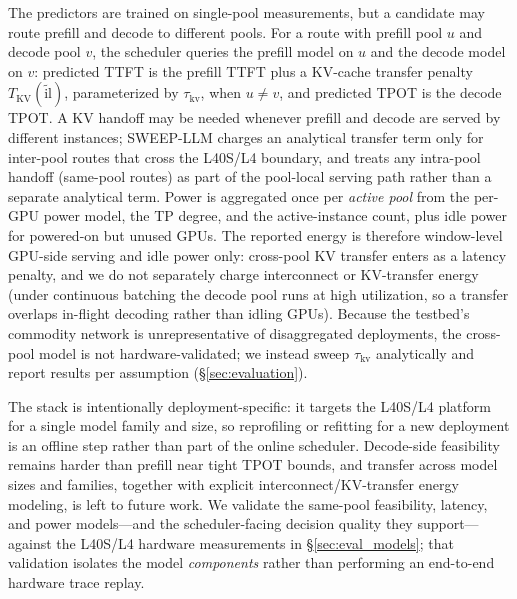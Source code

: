 The predictors are trained on single-pool measurements, but a candidate may route prefill and decode to different pools.
For a route with prefill pool $u$ and decode pool $v$, the scheduler queries the prefill model on $u$ and the decode model on $v$: predicted TTFT is the prefill TTFT plus a KV-cache transfer penalty $T_{\mathrm{KV}}(\tilde{\mathrm{il}})$, parameterized by $\tau_{\mathrm{kv}}$, when $u\neq v$, and predicted TPOT is the decode TPOT.
A KV handoff may be needed whenever prefill and decode are served by different instances; SWEEP-LLM charges an analytical transfer term only for inter-pool routes that cross the L40S/L4 boundary, and treats any intra-pool handoff (same-pool routes) as part of the pool-local serving path rather than a separate analytical term.
Power is aggregated once per \emph{active pool} from the per-GPU power model, the TP degree, and the active-instance count, plus idle power for powered-on but unused GPUs.
The reported energy is therefore window-level GPU-side serving and idle power only: cross-pool KV transfer enters as a latency penalty, and we do not separately charge interconnect or KV-transfer energy (under continuous batching the decode pool runs at high utilization, so a transfer overlaps in-flight decoding rather than idling GPUs).
Because the testbed's commodity network is unrepresentative of disaggregated deployments, the cross-pool model is not hardware-validated; we instead sweep $\tau_{\mathrm{kv}}$ analytically and report results per assumption (\S\ref{sec:evaluation}).

The stack is intentionally deployment-specific: it targets the L40S/L4 platform for a single model family and size, so reprofiling or refitting for a new deployment is an offline step rather than part of the online scheduler.
Decode-side feasibility remains harder than prefill near tight TPOT bounds, and transfer across model sizes and families, together with explicit interconnect/KV-transfer energy modeling, is left to future work.
We validate the same-pool feasibility, latency, and power models---and the scheduler-facing decision quality they support---against the L40S/L4 hardware measurements in \S\ref{sec:eval_models}; that validation isolates the model \emph{components} rather than performing an end-to-end hardware trace replay.
